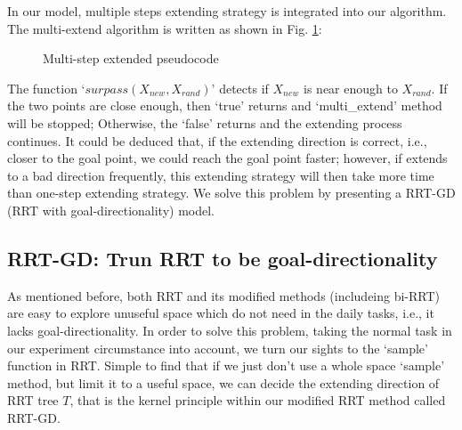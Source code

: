\documentclass[letterpaper, 10 pt, conference]{ieeeconf}  %
\begin{document}
In our model, multiple steps extending strategy is integrated into our algorithm. The multi-extend algorithm is written as shown in Fig. \ref{fig_multiExtend}:

\begin{figure}[thpb]
      \centering
      \caption{Multi-step extended pseudocode}
      \label{fig_multiExtend}
\end{figure}

The function `$surpass(X_{new},X_{rand})$' detects if $X_{new}$ is near enough to $X_{rand}$. If the two points are close enough, then `true' returns and `multi\_extend' method will be stopped; Otherwise, the `false' returns and the extending process continues. It could be deduced that, if the extending direction is correct, i.e., closer to the goal point, we could reach the goal point faster; however, if extends to a bad direction frequently, this extending strategy will then take more time than one-step extending strategy. We solve this problem by presenting a RRT-GD (RRT with goal-directionality) model. 

\subsection{RRT-GD: Trun RRT to be goal-directionality}

As mentioned before, both RRT and its modified methods (includeing bi-RRT) are easy to explore unuseful space which do not need in the daily tasks, i.e., it lacks goal-directionality. In order to solve this problem, taking the normal task in our experiment circumstance into account, we turn our sights to the `sample' function in RRT. Simple to find that if we just don't use a whole space `sample' method, but limit it to a useful space, we can decide the extending direction of RRT tree $T$, that is the kernel principle within our modified RRT method called RRT-GD.
\end{document}
